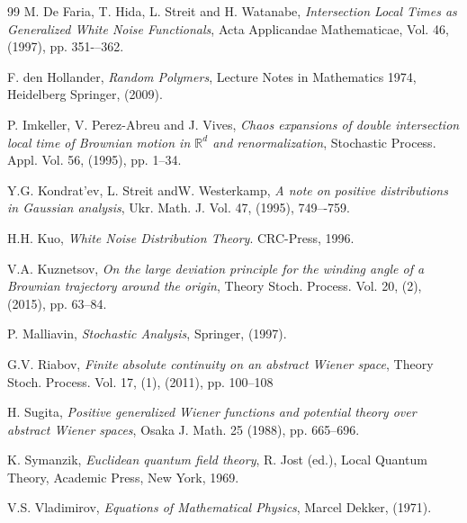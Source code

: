 \documentclass[]{interact}
\newcommand{\R}{{\mathbb{R}}}
\newcommand{\1}{\mathbf{1}}
\theoremstyle{plain}%
\theoremstyle{definition}
\theoremstyle{remark}
\begin{document}
\begin{thebibliography}{99}
M. De Faria, T. Hida, L. Streit and H. Watanabe, \emph{Intersection Local Times as Generalized White
Noise Functionals}, Acta Applicandae Mathematicae, Vol. 46, (1997), pp. 351-–362.



F. den Hollander, \emph{Random Polymers}, Lecture Notes in Mathematics 1974, Heidelberg Springer, (2009).


P. Imkeller, V. Perez-Abreu and J. Vives, \emph{Chaos expansions of double intersection local time of Brownian motion in $\R ^d $ and renormalization}, Stochastic Process. Appl. Vol. 56, (1995), pp. 1--34.


Y.G. Kondrat'ev, L. Streit andW.  Westerkamp, \emph{A note on positive distributions in Gaussian analysis}, Ukr. Math. J. Vol. 47, (1995), 749–-759.


H.H. Kuo, \emph{White Noise Distribution Theory}. CRC-Press, 1996.

V.A. Kuznetsov, \emph{On the large deviation principle for the winding angle of a Brownian trajectory around the origin}, Theory Stoch. Process. Vol. 20, (2), (2015), pp. 63--84. 


P. Malliavin, \emph{Stochastic Analysis}, Springer, (1997).

G.V. Riabov, \emph{Finite absolute continuity on an abstract Wiener space}, Theory Stoch. Process. Vol. 17, (1), (2011), pp. 100--108 



H. Sugita, \emph{Positive generalized Wiener functions and potential theory over abstract Wiener spaces}, Osaka J. Math. 25 (1988), pp. 665--696.

K. Symanzik, \emph{Euclidean quantum field theory}, R. Jost (ed.), Local Quantum Theory, Academic
Press, New York, 1969.


V.S. Vladimirov, \emph{Equations of Mathematical Physics},
 Marcel Dekker, (1971). 


\end{thebibliography}
\end{document}
